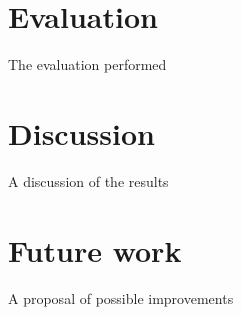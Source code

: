 \documentclass[]{report}
\begin{document}

\section{Evaluation}

The evaluation performed

\section{Discussion}

A discussion of the results

\section{Future work}

A proposal of possible improvements
\end{document}
